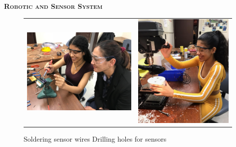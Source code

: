 \documentclass[final,t]{beamer}
\begin{document}
\begin{frame}{}
\begin{columns}
\begin{column}{.33\linewidth}
\begin{block}{\textsc{\textbf{Robotic and Sensor System}}}
                    \begin{center}
                    \begin{figure}
                    \begin{tabular}{cc}
                    \includegraphics[scale = 0.15]{assets/IMG_9097.JPG}
                    \hspace*{5mm}
                    &
                    \includegraphics[scale = 0.42]{assets/meworking1}
                    \end{tabular}
                    \caption{Soldering sensor wires \hspace{30mm} Drilling holes for sensors}
                    \end{figure}
                    \end{center}


\end{block}
\end{column}
\end{columns}
\end{frame}
\end{document}
